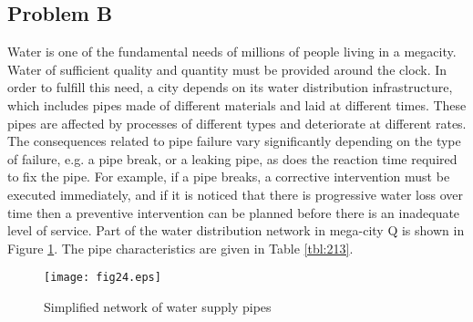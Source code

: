 \subsection{Problem B}
Water is one of the fundamental needs of millions of people living in a megacity. Water of sufficient quality and quantity must be provided around the clock. In order to fulfill this need, a city depends on its water distribution infrastructure, which includes pipes made of different materials and laid at different times. These pipes are affected by processes of different types and deteriorate at different rates. The consequences related to pipe failure vary significantly depending on the type of failure, e.g. a pipe break, or a leaking pipe, as does the reaction time required to fix the pipe. For example, if a pipe breaks, a corrective intervention must be executed immediately, and if it is noticed that there is progressive water loss over time then a preventive intervention can be planned before there is an inadequate level of service.  Part of the water distribution network in mega-city Q is shown in Figure \ref{fig24}. The pipe characteristics are given in Table \ref{tbl:213}. 

\begin{figure}[h]
\texttt{[image: fig24.eps]}
\caption{Simplified network of water supply pipes}\label{fig24}
\end{figure}


